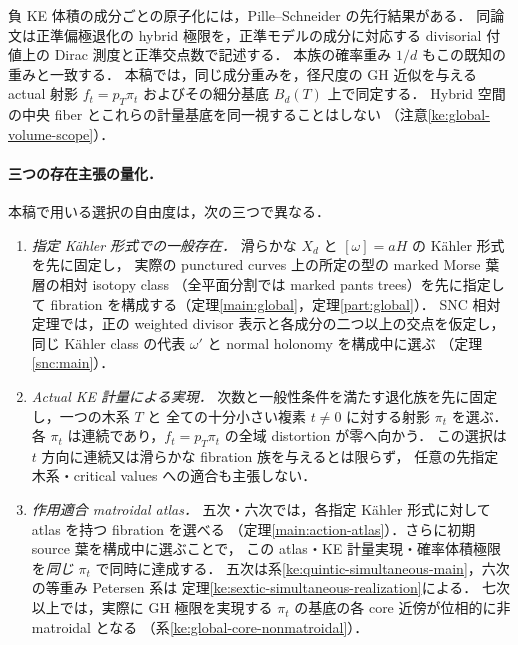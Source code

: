 負 KE 体積の成分ごとの原子化には，Pille--Schneider
\cite[Theorems~A--B, pp.~589--590]{PilleSchneiderHybrid}の先行結果がある．
同論文は正準偏極退化の hybrid 極限を，正準モデルの成分に対応する
divisorial 付値上の Dirac 測度と正準交点数で記述する．
本族の確率重み $1/d$ もこの既知の重みと一致する．
本稿では，同じ成分重みを，径尺度の GH 近似を与える actual 射影
$f_t=p_T\pi_t$ およびその細分基底 $B_d(T)$ 上で同定する．
Hybrid 空間の中央 fiber とこれらの計量基底を同一視することはしない
（注意\ref{ke:global-volume-scope}）．

\paragraph{三つの存在主張の量化．}\label{intro:existence-scopes}
本稿で用いる選択の自由度は，次の三つで異なる．
\begin{enumerate}
\item \emph{指定 Kähler 形式での一般存在．}
滑らかな $X_d$ と $[\omega]=aH$ の Kähler 形式を先に固定し，
実際の punctured curves 上の所定の型の marked Morse 葉層の相対 isotopy class
（全平面分割では marked pants trees）を先に指定して
fibration を構成する（定理\ref{main:global}，定理\ref{part:global}）．
SNC 相対定理では，正の weighted divisor 表示と各成分の二つ以上の交点を仮定し，
同じ Kähler class の代表 $\omega'$ と normal holonomy を構成中に選ぶ
（定理\ref{snc:main}）．
\item \emph{Actual KE 計量による実現．}
次数と一般性条件を満たす退化族を先に固定し，一つの木系 $T$ と
全ての十分小さい複素 $t\ne0$ に対する射影 $\pi_t$ を選ぶ．
各 $\pi_t$ は連続であり，$f_t=p_T\pi_t$ の全域 distortion が零へ向かう．
この選択は $t$ 方向に連続又は滑らかな fibration 族を与えるとは限らず，
任意の先指定木系・critical values への適合も主張しない．
\item \emph{作用適合 matroidal atlas．}
五次・六次では，各指定 Kähler 形式に対して atlas を持つ fibration を選べる
（定理\ref{main:action-atlas}）．さらに初期 source 葉を構成中に選ぶことで，
この atlas・KE 計量実現・確率体積極限を\emph{同じ} $\pi_t$ で同時に達成する．
五次は系\ref{ke:quintic-simultaneous-main}，六次の等重み Petersen 系は
定理\ref{ke:sextic-simultaneous-realization}による．
七次以上では，実際に GH 極限を実現する
$\pi_t$ の基底の各 core 近傍が位相的に非 matroidal となる
（系\ref{ke:global-core-nonmatroidal}）．
\end{enumerate}


